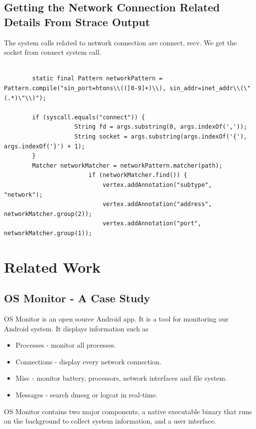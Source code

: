 \documentclass[12pt]{report}
\begin{document}
\section{Getting the Network Connection Related Details From Strace Output}
The system calls related to network connection are connect, recv. We get the socket from connect system call.
\begin{lstlisting}

        static final Pattern networkPattern = Pattern.compile("sin_port=htons\\(([0-9]+)\\), sin_addr=inet_addr\\(\"(.*)\"\\)"); 
        
        if (syscall.equals("connect")) {
                    String fd = args.substring(0, args.indexOf(','));
                    String socket = args.substring(args.indexOf('{'), args.indexOf('}') + 1);
        }
        Matcher networkMatcher = networkPattern.matcher(path);
                        if (networkMatcher.find()) {
                            vertex.addAnnotation("subtype", "network");
                            vertex.addAnnotation("address", networkMatcher.group(2));
                            vertex.addAnnotation("port", networkMatcher.group(1));
\end{lstlisting}


\chapter{Related Work}
\section{OS Monitor - A Case Study}


OS Monitor\citep{OSMonitor} is an open source Android app. It is a tool for monitoring our Android system. It displays information such as
\begin{itemize}
	\item Processes - monitor all processes.
	\item Connections - display every network connection.
	\item Misc - monitor battery, processors, network interfaces and file system.
	\item Messages - search dmesg or logcat in real-time.
\end{itemize}
OS Monitor contains two major components, a native executable binary that runs on the background to collect system information, and a user interface.
\end{document}
